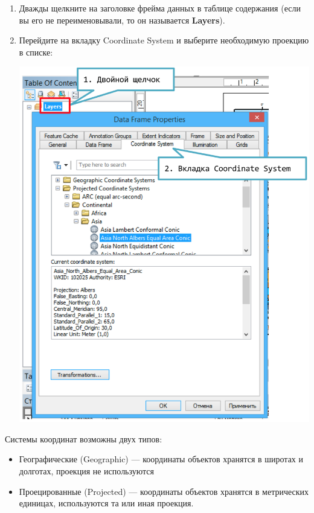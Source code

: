 \documentclass[]{book}
\theoremstyle{definition}
\theoremstyle{definition}
\theoremstyle{definition}
\theoremstyle{remark}
\begin{document}
\begin{enumerate}
\def\labelenumi{\arabic{enumi}.}
\item
  Дважды щелкните на заголовке фрейма данных в таблице содержания (если
  вы его не переименовывали, то он называется \textbf{Layers}).
\item
  Перейдите на вкладку Coordinate System и выберите необходимую проекцию
  в списке:

  \includegraphics{images/Appendix/image64.png}
\end{enumerate}

Системы координат возможны двух типов:

\begin{itemize}
\item
  Географические (Geographic) --- координаты объектов хранятся в широтах
  и долготах, проекция не используются
\item
  Проецированные (Projected) --- координаты объектов хранятся в
  метрических единицах, используются та или иная проекция.
\end{itemize}
\end{document}
